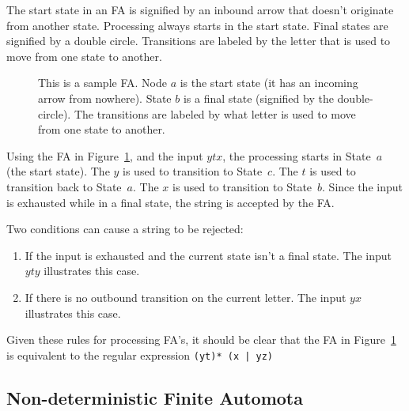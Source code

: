 \documentclass[letterpaper,12pt,openany,reqno]{book}%
\newcommand{\faterminalnode}[3] {\draw (#1) circle [radius=9pt]; \node at (#1) (#2) [circle, draw, minimum size=24pt] {#2};}
\newcommand{\fanonterminalnode}[3] {\node at (#1) (#2) [circle, draw, minimum size=24pt] {#2};}
\newcommand{\fatransition}[3] {\draw [->] (#1) -- (#2) node [midway, above] {#3};}
\newcommand{\faarctransition}[5] {\draw [->] (#1) to[out=#4, in=#5] node  [midway, above] {#3} (#2) ;}
\newcommand{\fastart}[1] {\coordinate (start) at (#1);}
\begin{document}
The start state in an FA is signified by an inbound arrow that doesn't originate from another state. Processing always starts in the start state. Final states are signified by a double circle. Transitions are labeled by the letter that is used to move from one state to another. 

\begin{figure}[hbt]
\centering
{}
 \caption[Sample Finite Automaton]{This is a sample FA. Node $a$ is the start state (it has an incoming arrow from nowhere). State $b$ is a final state (signified by the double-circle). The transitions are labeled by what letter is used to move from one state to another.}
  \label{F.FA_1}
\end{figure}

Using the FA in Figure~\ref{F.FA_1}, and the input $ytx$, the processing starts in State~$a$ (the start state). The $y$ is used to transition to State~$c$. The $t$ is used to transition back to State~$a$. The $x$ is used to transition to State~$b$. Since the input is exhausted while in a final state, the string is accepted by the FA.

Two conditions can cause a string to be rejected: 
\begin{enumerate}
\item If the input is exhausted and the current state isn't a final state. The input $yty$ illustrates this case.
\item If there is no outbound transition on the current letter. The input $yx$ illustrates this case.
\end{enumerate}

Given these rules for processing FA's, it should be clear that the FA in Figure~\ref{F.FA_1} is equivalent to the regular expression \texttt{(yt)* (x | yz)}

\subsection{Non-deterministic Finite Automota}
\end{document}

